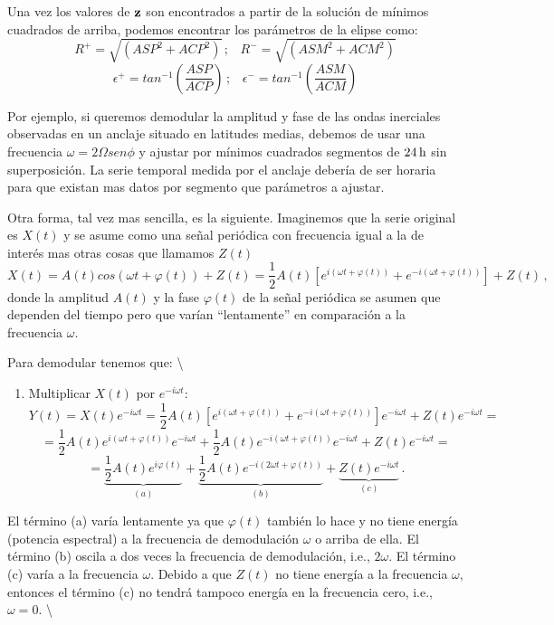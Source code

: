 \documentclass[
]{agujournal2019}
\providecommand{\tightlist}{%
  \setlength{\itemsep}{0pt}\setlength{\parskip}{0pt}}\usepackage{longtable,booktabs,array}
\begin{document}
Una vez los valores de \({\textbf z}\) son encontrados a partir de la
solución de mínimos cuadrados de arriba, podemos encontrar los
parámetros de la elipse como:
\[R^+=\sqrt{\left( ASP^2 + ACP^2\right)}\,;\,\,\,\,\,R^-=\sqrt{\left( ASM^2 + ACM^2\right)}\]
\[\epsilon^+=tan^{-1}\left(\frac{ASP}{ACP}\right)\,;\,\,\,\,\,\epsilon^-=tan^{-1}\left(\frac{ASM}{ACM}\right)\]

Por ejemplo, si queremos demodular la amplitud y fase de las ondas
inerciales observadas en un anclaje situado en latitudes medias, debemos
de usar una frecuencia \(\omega=2\Omega sen\phi\) y ajustar por mínimos
cuadrados segmentos de \(24\,{\rm h}\) sin superposición. La serie
temporal medida por el anclaje debería de ser horaria para que existan
mas datos por segmento que parámetros a ajustar.

Otra forma, tal vez mas sencilla, es la siguiente. Imaginemos que la
serie original es \(X(t)\) y se asume como una señal periódica con
frecuencia igual a la de interés mas otras cosas que llamamos \(Z(t)\)
\[X(t)=A(t)cos\left(\omega t + \varphi(t)\right) + Z(t)= \frac{1}{2}A(t)
       \left[e^{i(\omega t + \varphi(t))} + e^{-i(\omega t + \varphi(t))} \right] + Z(t)\,,\]
donde la amplitud \(A(t)\) y la fase \(\varphi(t)\) de la señal
periódica se asumen que dependen del tiempo pero que varían
``lentamente'' en comparación a la frecuencia \(\omega\).

Para demodular tenemos que: \textbackslash{}

\begin{enumerate}
\def\labelenumi{(\arabic{enumi})}
\tightlist
\item
  Multiplicar \(X(t)\) por \(e^{-i\omega t}\):
  \[Y(t)=X(t)e^{-i\omega t}=\frac{1}{2}A(t)
     \left[e^{i(\omega t + \varphi(t))} + e^{-i(\omega t + \varphi(t))} \right]e^{-i\omega t} + Z(t)e^{-i\omega t}=\]
  \[=\frac{1}{2}A(t)e^{i(\omega t + \varphi(t))}e^{-i\omega t} + \frac{1}{2}A(t)e^{-i(\omega t + \varphi(t))}e^{-i\omega t} +
  Z(t)e^{-i\omega t}=\]
  \[=\underbrace{\frac{1}{2}A(t)e^{i\varphi(t)}}_{(a)} + \underbrace{\frac{1}{2}A(t)e^{-i(2\omega t + \varphi(t))}}_{(b)} +
  \underbrace{Z(t)e^{-i\omega t}}_{(c)}\,.\]
\end{enumerate}

El término (a) varía lentamente ya que \(\varphi(t)\) también lo hace y
no tiene energía (potencia espectral) a la frecuencia de demodulación
\(\omega\) o arriba de ella. El término (b) oscila a dos veces la
frecuencia de demodulación, i.e., \(2\omega\). El término (c) varía a la
frecuencia \(\omega\). Debido a que \(Z(t)\) no tiene energía a la
frecuencia \(\omega\), entonces el término (c) no tendrá tampoco energía
en la frecuencia cero, i.e., \(\omega=0\). \textbackslash{}
\end{document}
